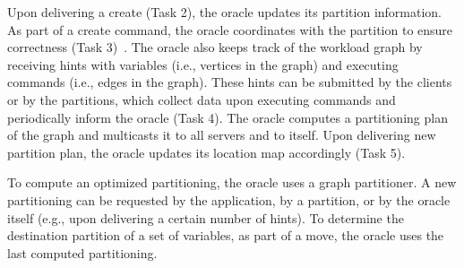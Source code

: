 Upon delivering a create (Task 2), the oracle updates its partition information.
As part of a create command, the oracle coordinates with the partition to ensure correctness (Task 3)~\cite{bezerra2014ssmr}.
%
The oracle also keeps track of the workload graph by receiving hints with variables (i.e., vertices in the graph) and executing commands (i.e., edges in the graph). These hints can be submitted by the clients or by the partitions, which collect data upon executing commands and periodically inform the oracle (Task 4).
The oracle computes a partitioning plan of the graph and multicasts it to all servers and to itself. Upon delivering new partition plan, the oracle updates its location map accordingly (Task 5).

To compute an optimized partitioning, the oracle uses a graph partitioner.
A new partitioning can be requested by the application, by a partition, or by the oracle itself (e.g., upon delivering a certain number of hints).
To determine the destination partition of a set of variables, as part of a move, the oracle uses 
the last computed partitioning.


